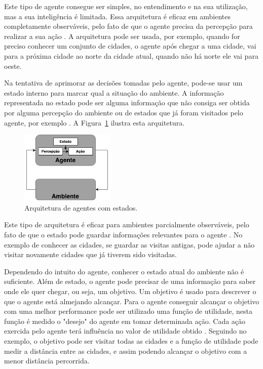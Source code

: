 Este tipo de agente consegue ser simples, no entendimento e na sua utilização, mas a sua inteligência é limitada. Essa arquitetura é eficaz em ambientes completamente observáveis, pelo fato de que o agente precisa da percepção para realizar a sua ação \cite{intelligence2003modern}. A arquitetura pode ser usada, por exemplo, quando for preciso conhecer um conjunto de cidades, o agente após chegar a uma cidade, vai para a próxima cidade ao norte da cidade atual, quando não há norte ele vai para oeste. 

Na tentativa de aprimorar as decisões tomadas pelo agente, pode-se usar um estado interno para marcar qual a situação do ambiente. A informação representada no estado pode ser alguma informação que não consiga ser obtida por alguma percepção do ambiente ou de estados que já foram visitados pelo agente, por exemplo \cite{intelligence2003modern}. A Figura~\ref{fig:agenteModelbased} ilustra esta arquitetura. 

\begin{figure}[ht]
	\centering
	\includegraphics[width=0.4\textwidth]{fig/agentModel.pdf}
	\caption{Arquitetura de agentes com estados.}
	\label{fig:agenteModelbased}
\end{figure} 

Este tipo de arquitetura é eficaz para ambientes parcialmente observáveis, pelo fato de que o estado pode guardar informações relevantes para o agente \cite{intelligence2003modern}. No exemplo de conhecer as cidades, se guardar as visitas antigas, pode ajudar a não visitar novamente cidades que já tiverem sido visitadas. 

Dependendo do intuito do agente, conhecer o estado atual do ambiente não é suficiente. Além de estado, o agente pode precisar de uma informação para saber onde ele quer chegar, ou seja, um objetivo. Um objetivo é usado para descrever o que o agente está almejando alcançar. Para o agente conseguir alcançar o objetivo com uma melhor performance pode ser utilizado uma função de utilidade, nesta função é medido o "desejo" do agente em tomar determinada ação. Cada ação exercida pelo agente terá influência no valor de utilidade obtido \cite{intelligence2003modern}. Seguindo no exemplo, o objetivo pode ser visitar todas as cidades e a função de utilidade pode medir a distância entre as cidades, e assim podendo alcançar o objetivo com a menor distância percorrida. 


